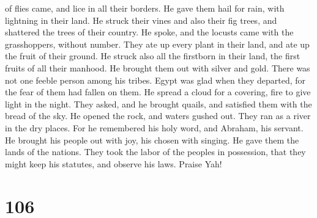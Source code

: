 of flies came, and lice in all their borders.  He gave
them hail for rain, with lightning in their land.  He
struck their vines and also their fig trees, and shattered the trees of
their country.  He spoke, and the locusts came with the
grasshoppers, without number.  They ate up every plant in
their land, and ate up the fruit of their ground.  He
struck also all the firstborn in their land, the first fruits of all
their manhood.  He brought them out with silver and gold.
There was not one feeble person among his tribes.  Egypt
was glad when they departed, for the fear of them had fallen on them.
 He spread a cloud for a covering, fire to give light in
the night.  They asked, and he brought quails, and
satisfied them with the bread of the sky.  He opened the
rock, and waters gushed out. They ran as a river in the dry places.
 For he remembered his holy word, and Abraham, his
servant.  He brought his people out with joy, his chosen
with singing.  He gave them the lands of the nations.
They took the labor of the peoples in possession,  that
they might keep his statutes, and observe his laws. Praise Yah!

\hypertarget{section-98}{%
\section{106}\label{section-98}}

